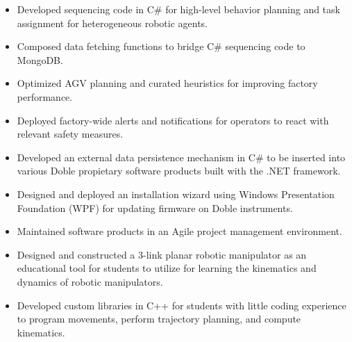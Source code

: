\documentclass[10pt,a4paper,ragged2e,withhyper]{altacv}
\begin{document}
\begin{paracol}{2}
    \vspace{-1.5em} %
    \begin{itemize}
        \item Developed sequencing code in C\# for high-level behavior planning and task assignment for heterogeneous robotic agents.
        \item Composed data fetching functions to bridge C\# sequencing code to MongoDB.
        \item Optimized AGV planning and curated heuristics for improving factory performance.
        \item Deployed factory-wide alerts and notifications for operators to react with relevant safety measures.
    \end{itemize}
    \begin{itemize}
        \item Developed an external data persistence mechanism in C\# to be inserted into various Doble propietary software products built with the .NET framework.
        \item Designed and deployed an installation wizard using Windows Presentation Foundation (WPF) for updating firmware on Doble instruments.
        \item Maintained software products in an Agile project management environment.
    \end{itemize}
    \begin{itemize}
        \item Designed and constructed a 3-link planar robotic manipulator as an educational tool for students to utilize for learning the kinematics and dynamics of robotic manipulators.
        \item Developed custom libraries in C++ for students with little coding experience to program movements, perform trajectory planning, and compute kinematics.

\end{itemize}
\end{paracol}
\end{document}
